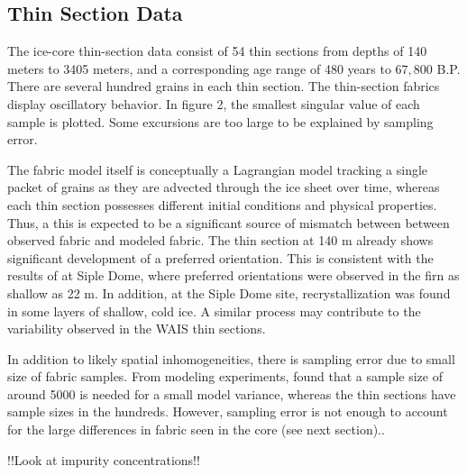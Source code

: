 \documentclass{igs}
\begin{document}
\subsection{Thin Section Data}
The ice-core thin-section data consist of 54 thin sections from depths of 140 meters to 3405 meters, and a corresponding age range of 480 years to $67,800$ B.P. There are several hundred grains in each thin section. The thin-section fabrics display oscillatory behavior. In figure 2, the smallest singular value of each sample is plotted. Some excursions are too large to be explained by sampling error.  

The fabric model itself is conceptually a Lagrangian model tracking a single packet of grains as they are advected through the ice sheet over time, whereas each thin section possesses different initial conditions and physical properties. Thus, a this is expected to be a significant source of mismatch between between observed fabric and modeled fabric. The thin section at 140 m already shows significant development of a preferred orientation. This is consistent with the results of \citet{diprinzio2005} at Siple Dome, where preferred orientations were observed in the firn as shallow as 22 m. In addition, at the Siple Dome site, recrystallization was found in some layers of shallow, cold ice. A similar process may contribute to the variability observed in the WAIS thin sections.

 In addition to likely spatial inhomogeneities, there is sampling error due to small size of fabric samples. From modeling experiments, \citet{thorsteinsson2002nni} found that a sample size of around 5000 is needed for a small model variance, whereas the thin sections have sample sizes in the hundreds. However, sampling error is not enough to account for the large differences in fabric seen in the core (see next section)..    

!!Look at impurity concentrations!!
\end{document}
